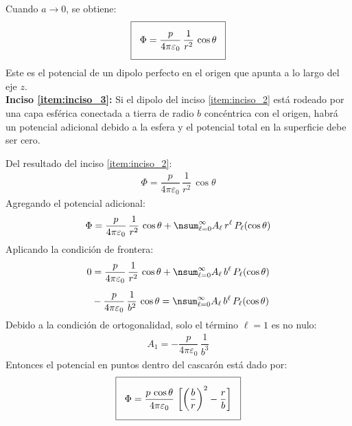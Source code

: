 Cuando $a \to 0$, se obtiene:
\begin{align*}
\setlength{\fboxsep}{3\fboxsep}\boxed{
\Phi = \dfrac{p}{4 \pi \varepsilon_{0}} \, \dfrac{1}{r^{2}} \, \cos \theta }
\end{align*}
Este es el potencial de un dipolo perfecto en el origen que apunta a lo largo del eje $z$.
\\[1em]
\noindent
\textbf{Inciso \ref{item:inciso_3}: } Si el dipolo del inciso \ref{item:inciso_2} está rodeado por una capa esférica conectada a tierra de radio $b$ concéntrica con el origen, habrá un potencial adicional debido a la esfera y el potencial total en la superficie debe ser cero.
\par
\noindent
Del resultado del inciso \ref{item:inciso_2}:
\begin{align*}
\Phi = \dfrac{p}{4 \pi \varepsilon_{0}} \, \dfrac{1}{r^{2}} \, \cos \theta
\end{align*}
Agregando el potencial adicional:
\begin{align*}
\Phi = \dfrac{p}{4 \pi \varepsilon_{0}} \, \dfrac{1}{r^{2}} \, \cos \theta + \nsum_{\ell=0}^{\infty} A_{\ell} \, r^{\ell} \, P_{\ell} (\cos \theta)
\end{align*}
Aplicando la condición de frontera:
\begin{align*}
0 &= \dfrac{p}{4 \pi \varepsilon_{0}} \, \dfrac{1}{r^{2}} \, \cos \theta + \nsum_{\ell=0}^{\infty} A_{\ell} \, b^{\ell} \, P_{\ell} (\cos \theta) \\[0.5em]
&- \dfrac{p}{4 \pi \varepsilon_{0}} \, \dfrac{1}{b^{2}} \, \cos \theta = \nsum_{\ell=0}^{\infty} A_{\ell} \, b^{\ell} \, P_{\ell} (\cos \theta)
\end{align*}
Debido a la condición de ortogonalidad, solo el término $\ell = 1$ es no nulo:
\begin{align*}
A_{1} = - \dfrac{p}{4 \pi \varepsilon_{0}} \, \dfrac{1}{b^{3}}
\end{align*}
Entonces el potencial en puntos dentro del cascarón está dado por:
\begin{align*}
\setlength{\fboxsep}{3\fboxsep}\boxed{
\Phi = \dfrac{p \, \cos \theta}{4 \pi \varepsilon_{0}} ~ \bigg[ \bigg( \dfrac{b}{r} \bigg)^{2} - \dfrac{r}{b} \bigg] }
\end{align*}

